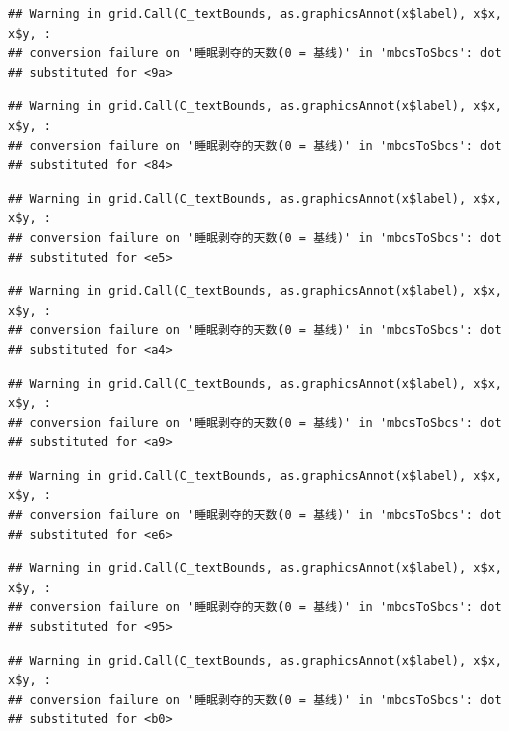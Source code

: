 \documentclass[
]{book}
\begin{document}
\begin{verbatim}
## Warning in grid.Call(C_textBounds, as.graphicsAnnot(x$label), x$x, x$y, :
## conversion failure on '睡眠剥夺的天数(0 = 基线)' in 'mbcsToSbcs': dot
## substituted for <9a>
\end{verbatim}

\begin{verbatim}
## Warning in grid.Call(C_textBounds, as.graphicsAnnot(x$label), x$x, x$y, :
## conversion failure on '睡眠剥夺的天数(0 = 基线)' in 'mbcsToSbcs': dot
## substituted for <84>
\end{verbatim}

\begin{verbatim}
## Warning in grid.Call(C_textBounds, as.graphicsAnnot(x$label), x$x, x$y, :
## conversion failure on '睡眠剥夺的天数(0 = 基线)' in 'mbcsToSbcs': dot
## substituted for <e5>
\end{verbatim}

\begin{verbatim}
## Warning in grid.Call(C_textBounds, as.graphicsAnnot(x$label), x$x, x$y, :
## conversion failure on '睡眠剥夺的天数(0 = 基线)' in 'mbcsToSbcs': dot
## substituted for <a4>
\end{verbatim}

\begin{verbatim}
## Warning in grid.Call(C_textBounds, as.graphicsAnnot(x$label), x$x, x$y, :
## conversion failure on '睡眠剥夺的天数(0 = 基线)' in 'mbcsToSbcs': dot
## substituted for <a9>
\end{verbatim}

\begin{verbatim}
## Warning in grid.Call(C_textBounds, as.graphicsAnnot(x$label), x$x, x$y, :
## conversion failure on '睡眠剥夺的天数(0 = 基线)' in 'mbcsToSbcs': dot
## substituted for <e6>
\end{verbatim}

\begin{verbatim}
## Warning in grid.Call(C_textBounds, as.graphicsAnnot(x$label), x$x, x$y, :
## conversion failure on '睡眠剥夺的天数(0 = 基线)' in 'mbcsToSbcs': dot
## substituted for <95>
\end{verbatim}

\begin{verbatim}
## Warning in grid.Call(C_textBounds, as.graphicsAnnot(x$label), x$x, x$y, :
## conversion failure on '睡眠剥夺的天数(0 = 基线)' in 'mbcsToSbcs': dot
## substituted for <b0>
\end{verbatim}
\end{document}
